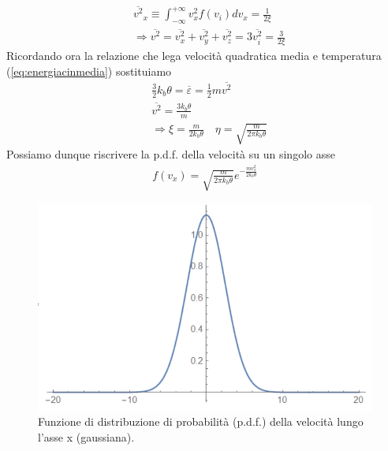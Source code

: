 \documentclass[
10pt, %
a4paper, %
oneside, %
headinclude,footinclude, %
BCOR5mm, %
]{scrartcl}
\begin{document}
\begin{align*} 
	&\overline{v^2}_x \equiv \int_{-\infty}^{+\infty} v_x^2 f(v_i)dv_x = \frac{1}{2\xi}\\
	&\Rightarrow \overline{v^2} = \overline{v_x^2}+\overline{v_y^2}+\overline{v_z^2} = 3\overline{ v_i^2} = \frac{3}{2\xi}
\end{align*} 
Ricordando ora la relazione che lega velocità quadratica media e temperatura (\ref{eq:energiacinmedia}) sostituiamo
\begin{align*} 
	&\frac{3}{2} k_b \theta = \overline{\varepsilon} = \frac{1}{2} m \overline{v^2}\\
	&\overline{v^2} = \frac{3k_b\theta}{m}\\
	&\Rightarrow \xi = \frac{m}{2k_b\theta} \quad \eta = \sqrt{\frac{m}{2\pi k_b \theta}}
\end{align*} 
Possiamo dunque riscrivere la p.d.f. della velocità su un singolo asse
\begin{align*} 
	f(v_x) = \sqrt{\frac{m}{2\pi k_b\theta}} e^{-\frac{m v_x^2}{2 k_b \theta}}
\end{align*} 
\begin{figure}[h!]
	\centering
	\includegraphics[width=0.6\linewidth]{../images/gausspdf}
	\caption{Funzione di distribuzione di probabilità (p.d.f.) della velocità lungo l'asse x (gaussiana).}
	\label{fig:gausspdf}
\end{figure}
\FloatBarrier
\end{document}
